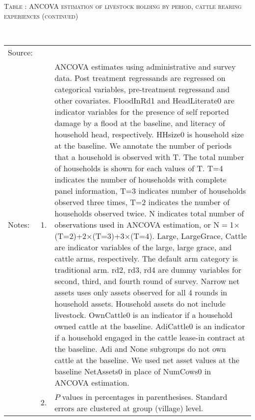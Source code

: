 \addtocounter{table}{-1}
\hspace{-1cm}\begin{minipage}[t]{14cm}
\hfil\textsc{\normalsize Table \thetable: ANCOVA estimation of livestock holding by period, cattle rearing experiences (continued) \label{tab ANCOVA livestock holding Experience timevarying 2}}\\
\setlength{\tabcolsep}{1pt}
\setlength{\baselineskip}{8pt}
\renewcommand{\arraystretch}{.52}
\hfil{}\\
\renewcommand{\arraystretch}{.8}
\setlength{\tabcolsep}{1pt}
\begin{tabular}{>{\hfill\scriptsize}p{1cm}<{}>{\hfill\scriptsize}p{.25cm}<{}>{\scriptsize}p{12cm}<{\hfill}}
Source:& \multicolumn{2}{l}{\scriptsize Estimated with GUK administrative and survey data.}\\
Notes: & 1. & ANCOVA estimates using administrative and survey data. Post treatment regressands are regressed on categorical variables, pre-treatment regressand and other covariates. \textsf{FloodInRd1} and \textsf{HeadLiterate0} are indicator variables for the presence of self reported damage by a flood at the baseline, and literacy of household head, respectively. \textsf{HHsize0} is household size at the baseline. We annotate the number of periods that a household is observed with \textsf{T}. The total number of households is shown for each values of \textsf{T}. \textsf{T=4} indicates the number of households with complete panel information, \textsf{T=3} indicates number of households observed three times, \textsf{T=2} indicates the number of households observed twice. \textsf{N} indicates total number of observations used in ANCOVA estimation, or \textsf{N$=$1$\times$(T=2)+2$\times$(T=3)+3$\times$(T=4)}.  \textsf{Large}, \textsf{LargeGrace}, \textsf{Cattle} are indicator variables of the \textsf{large}, \textsf{large grace}, and \textsf{cattle} arms, respectively. The default arm category is \textsf{traditional} arm. \textsf{rd2, rd3, rd4} are dummy variables for second, third, and fourth round of survey. Narrow net assets uses only assets observed for all 4 rounds in household assets. Household assets do not include livestock. \textsf{OwnCattle0} is an indicator if a household owned cattle at the baseline. \textsf{AdiCattle0} is an indicator if a household engaged in the cattle lease-in contract at the baseline.  \textsf{Adi} and \textsf{None} subgroups do not own cattle at the baseline. We used net asset values at the baseline \textsf{NetAssets0} in place of \textsf{NumCows0} in ANCOVA estimation.\\
& 2. & $P$ values in percentages in parenthesises. Standard errors are clustered at group (village) level.
\end{tabular}
\end{minipage}

